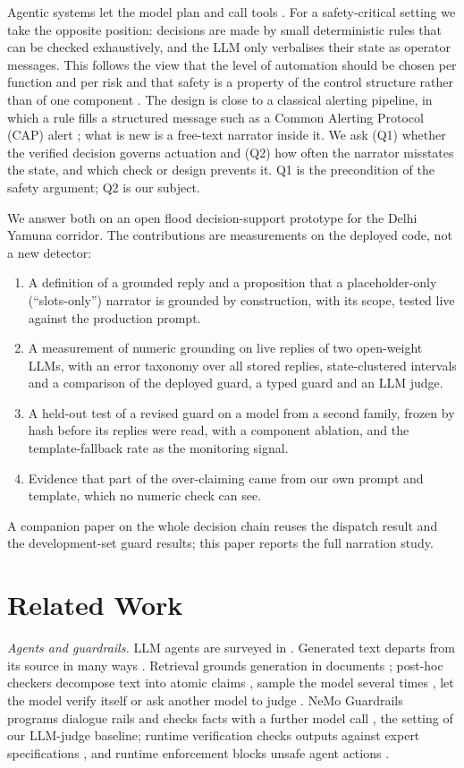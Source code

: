 \documentclass[conference]{IEEEtran}
\begin{document}
Agentic systems let the model plan and call tools \cite{Yao2023,Wu2024}. For a safety-critical setting we take the opposite position: decisions are made by small deterministic rules that can be checked exhaustively, and the LLM only verbalises their state as operator messages. This follows the view that the level of automation should be chosen per function and per risk \cite{Parasuraman2000} and that safety is a property of the control structure rather than of one component \cite{Leveson2011}. The design is close to a classical alerting pipeline, in which a rule fills a structured message such as a Common Alerting Protocol (CAP) alert \cite{CAP2010}; what is new is a free-text narrator inside it. We ask (Q1) whether the verified decision governs actuation and (Q2) how often the narrator misstates the state, and which check or design prevents it. Q1 is the precondition of the safety argument; Q2 is our subject.

We answer both on an open flood decision-support prototype for the Delhi Yamuna corridor. The contributions are measurements on the deployed code, not a new detector:
\begin{enumerate}
\item A definition of a grounded reply and a proposition that a placeholder-only (``slots-only'') narrator is grounded by construction, with its scope, tested live against the production prompt.
\item A measurement of numeric grounding on \LiveN{} live replies of two open-weight LLMs, with an error taxonomy over all \TaxN{} stored replies, state-clustered intervals and a comparison of the deployed guard, a typed guard and an LLM judge.
\item A held-out test of a revised guard on a model from a second family, frozen by hash before its replies were read, with a component ablation, and the template-fallback rate as the monitoring signal.
\item Evidence that part of the over-claiming came from our own prompt and template, which no numeric check can see.
\end{enumerate}
A companion paper on the whole decision chain reuses the dispatch result and the development-set guard results; this paper reports the full narration study.

\section{Related Work}
\textit{Agents and guardrails.} LLM agents are surveyed in \cite{WangL2024}. Generated text departs from its source in many ways \cite{Ji2023}. Retrieval grounds generation in documents \cite{Lewis2020}; post-hoc checkers decompose text into atomic claims \cite{Min2023}, sample the model several times \cite{Manakul2023}, let the model verify itself \cite{Dhuliawala2024} or ask another model to judge \cite{Zheng2023}. NeMo Guardrails programs dialogue rails and checks facts with a further model call \cite{Rebedea2023}, the setting of our LLM-judge baseline; runtime verification checks outputs against expert specifications \cite{Zhang2025}, and runtime enforcement blocks unsafe agent actions \cite{WangH2026}.
\end{document}
